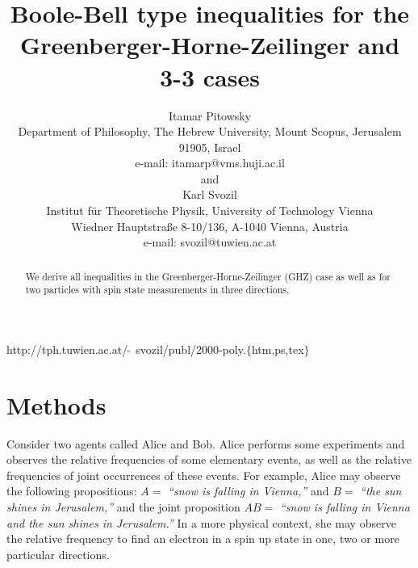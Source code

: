 

\def\Bbb{\bf }
\sloppy



\title{Boole-Bell type inequalities for the Greenberger-Horne-Zeilinger and 3-3 cases}
\author{Itamar Pitowsky \\
 {\small Department of Philosophy, The Hebrew University,}
  {\small Mount Scopus, Jerusalem 91905, Israel }     \\
  {\small e-mail: itamarp@vms.huji.ac.il}   \\
{\small and}\\
Karl Svozil\\
 {\small Institut f\"ur Theoretische Physik, University of Technology Vienna }     \\
  {\small Wiedner Hauptstra\ss e 8-10/136,}
  {\small A-1040 Vienna, Austria   }            \\
  {\small e-mail: svozil@tuwien.ac.at}}
\date{ }
\maketitle

\begin{flushright}
{\scriptsize http://tph.tuwien.ac.at/$\widetilde{\;\;}\,$svozil/publ/2000-poly.$\{$htm,ps,tex$\}$}
\end{flushright}

\begin{abstract}
We derive all inequalities in the Greenberger-Horne-Zeilinger (GHZ) case
as well as for two particles with
 spin state measurements in three directions.
\end{abstract}


\newpage
\section{Methods}

Consider two agents called Alice and Bob.
Alice performs some experiments
and observes the relative frequencies of some elementary events,
as well as the relative frequencies of joint occurrences of these events.
For example, Alice may observe
the following propositions: $A=$ {\em  ``snow is falling in Vienna,''} %
and $B=$ {\em  ``the sun shines in Jerusalem,''} and the joint proposition
$AB=$ {\em  ``snow is falling in Vienna and the sun shines in Jerusalem.''}
In a more physical context,
she may observe the relative frequency to find an electron in a spin up state
in one, two or more particular directions.

